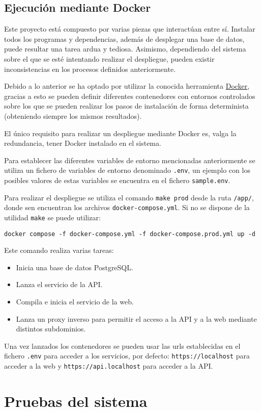 \subsection{Ejecución mediante Docker}

Este proyecto está compuesto por varias piezas que interactúan entre sí.
Instalar todos los programas y dependencias, además de desplegar una base de
datos, puede resultar una tarea ardua y tediosa. Asimismo, dependiendo del
sistema sobre el que se esté intentando realizar el despliegue, pueden existir
inconsistencias en los procesos definidos anteriormente.

Debido a lo anterior se ha optado por utilizar la conocida herramienta
\href{https://www.docker.com/}{Docker}, gracias a esto se pueden definir
diferentes contenedores con entornos controlados sobre los que se pueden
realizar los pasos de instalación de forma determinista (obteniendo siempre los
mismos resultados).

El único requisito para realizar un despliegue mediante Docker es, valga la
redundancia, tener Docker instalado en el sistema.

Para establecer las diferentes variables de entorno mencionadas anteriormente se
utiliza un fichero de variables de entorno denominado \texttt{.env}, un ejemplo
con los posibles valores de estas variables se encuentra en el fichero
\texttt{sample.env}.

Para realizar el despliegue se utiliza el comando \texttt{make prod} desde la
ruta \texttt{/app/}, donde sen encuentran los archivos
\texttt{docker-compose.yml}. Si no se dispone de la utilidad \texttt{make} se
puede utilizar:

\texttt{docker compose -f docker-compose.yml -f docker-compose.prod.yml up -d}

Este comando realiza varias tareas:

\begin{itemize}
    \item Inicia una base de datos PostgreSQL.
    \item Lanza el servicio de la API.
    \item Compila e inicia el servicio de la web.
    \item Lanza un proxy inverso para permitir el acceso a la API y a la web
    mediante distintos subdominios.
\end{itemize}

Una vez lanzados los contenedores se pueden usar las urls establecidas en el
fichero \texttt{.env} para acceder a los servicios, por defecto:
\texttt{https://localhost} para acceder a la web y
\texttt{https://api.localhost} para acceder a la API.

\section{Pruebas del sistema}
